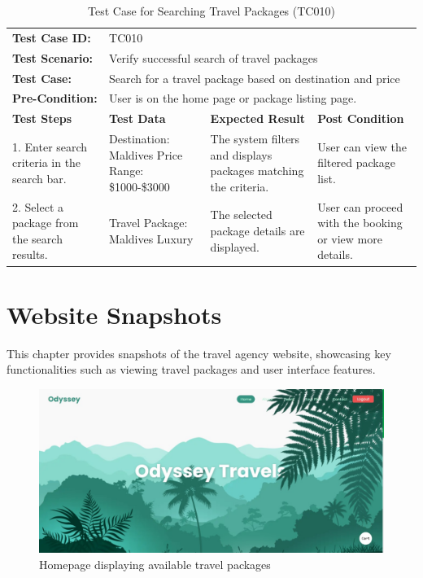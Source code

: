 \documentclass{scrreprt}
\begin{document}
    \begin{longtable}{| m{2cm} | m{5cm} | m{4cm} | m{3cm} |}
    \caption{Test Case for Searching Travel Packages (TC010)}
    \vspace{0.5cm} \\ \hline
    \textbf{Test Case ID:} & \multicolumn{3}{l|}{TC010} \\ \hline
    \textbf{Test Scenario:} & \multicolumn{3}{l|}{Verify successful search of travel packages} \\ \hline
    \textbf{Test Case:} & \multicolumn{3}{l|}{Search for a travel package based on destination and price} \\ \hline
    \textbf{Pre-Condition:} & \multicolumn{3}{l|}{User is on the home page or package listing page.} \\ \hline
    \textbf{Test Steps} & \textbf{Test Data} & \textbf{Expected Result} & \textbf{Post Condition} \\ \hline
    1. Enter search criteria in the search bar. & Destination: Maldives \newline Price Range: \$1000-\$3000 & The system filters and displays packages matching the criteria. & User can view the filtered package list. \\ \hline
    2. Select a package from the search results. & Travel Package: Maldives Luxury & The selected package details are displayed. & User can proceed with the booking or view more details. \\ \hline
    \end{longtable}

    \chapter{Website Snapshots}

This chapter provides snapshots of the travel agency website, showcasing key functionalities such as viewing travel packages and user interface features.

\begin{figure}[h!]
    \centering
    \includegraphics[width=1.1\textwidth, height=0.4\textheight]{./SS/home.jpg}
    \caption{Homepage displaying available travel packages}
    \label{fig:homepage}
\end{figure}
\end{document}
